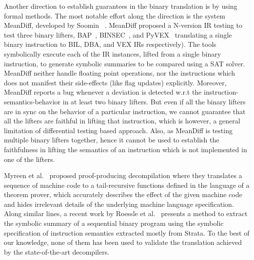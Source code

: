 Another direction to establish guarantees in the binary translation is by using
formal methods. The most notable effort along the direction is the system
MeanDiff, developed by Soomin \etal~\cite{ASE2017}.
%
MeanDiff proposed a N-version IR testing to test three binary lifters,
         BAP~\cite{BAP:CAV11}, BINSEC~\cite{BINSEC2011}, and PyVEX~\cite{PYVEX}
         translating a single binary instruction  to BIL, DBA, and VEX IRs
         respectively). The tools symbolically execute each of the IR
         instances, lifted from a single binary instruction, to generate
         symbolic summaries to be compared using a SAT solver. MeanDiff neither
         handle floating point operations, nor the instructions which does not
         manifest their side-effects (like flag updates) explicitly. Moreover,
         MeanDiff reports a bug whenever a deviation is detected w.r.t the
         instruction-semantics-behavior in at least two binary lifters. But
         even if all the binary lifters are in sync on the behavior of a
         particular instruction, we cannot guarantee that all the lifters are
         faithful in lifting that instruction, which is however, a general
         limitation of differential testing based approach. Also, as MeanDiff
         is testing multiple binary lifters  together, hence it cannot be used
         to establish the faithfulness in lifting the semantics of an
         instruction which is not implemented in one of the lifters. 
%

Myreen et al.~\cite{Myreen:FMCAD:2008,Myreen:FMCAD:2012} proposed
proof-producing decompilation where they translates a sequence of machine code
to a tail-recursive functions defined in the language of a theorem prover,
   which accurately describes the effect of the given machine code and hides
   irrelevant details of the underlying machine language specification. Along
   similar lines,  a recent work by Roessle et al.~\cite{Roessle:CPP19}
   presents a method to extract the symbolic summary of a sequential binary
   program using the symbolic specification of instruction semantics extracted
   mostly from Strata. To the best of our knowledge, none of them has been used
   to validate the translation achieved by the state-of-the-art decompilers. 
%

